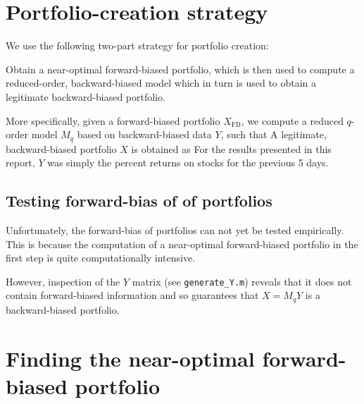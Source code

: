 \documentclass{article}
\begin{document}
 \clearpage


\section{Portfolio-creation strategy}

    We use the following two-part strategy for portfolio creation:
    \begin{enumerate}
        \I  Obtain a near-optimal forward-biased portfolio, which is then used to
        \I  compute a reduced-order, backward-biased model which in turn is used
            to obtain a legitimate backward-biased portfolio.
    \end{enumerate}

    More specifically, given a forward-biased portfolio $X_\text{FB}$,
        we compute a reduced $q$-order model $M_q$ based on backward-biased data $Y$, such that
    A legitimate, backward-biased portfolio $X$ is obtained as
    For the results presented in this report, $Y$ was simply 
        the percent returns on stocks for the previous 5 days.
            
\subsection{Testing forward-bias of of portfolios}
    Unfortunately, the forward-bias of portfolios can not yet
        be tested empirically.
    This is because the computation of a near-optimal forward-biased portfolio
        in the first step is quite computationally intensive.

    However, inspection of the $Y$ matrix (see \verb+generate_Y.m+)
        reveals that it does not contain forward-biased information
        and so guarantees that $X = M_q Y$ is a backward-biased portfolio.



\section{Finding the near-optimal forward-biased portfolio}
\end{document}
